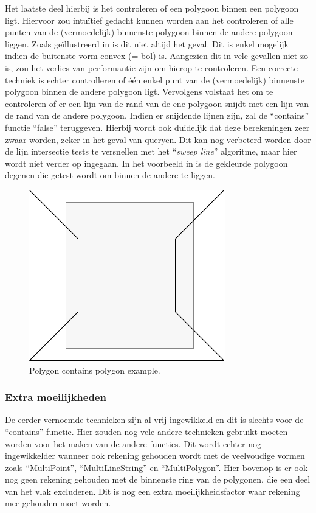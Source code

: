 Het laatste deel hierbij is het controleren of een polygoon binnen een polygoon ligt. Hiervoor zou intuïtief gedacht kunnen worden aan het controleren of alle punten van de (vermoedelijk) binnenste polygoon binnen de andere polygoon liggen. Zoals geïllustreerd in  is dit niet altijd het geval. Dit is enkel mogelijk indien de buitenste vorm convex (= bol) is. Aangezien dit in vele gevallen niet zo is, zou het verlies van performantie zijn om hierop te controleren. Een correcte techniek is echter controlleren of één enkel punt van de (vermoedelijk) binnenste polygoon binnen de andere polygoon ligt. Vervolgens volstaat het om te controleren of er een lijn van de rand van de ene polygoon snijdt met een lijn van de rand van de andere polygoon. Indien er snijdende lijnen zijn, zal de ``contains'' functie ``false'' teruggeven. Hierbij wordt ook duidelijk dat deze berekeningen zeer zwaar worden, zeker in het geval van queryen. Dit kan nog verbeterd worden door de lijn intersectie tests te versnellen met het ``\textit{sweep line}'' algoritme, maar hier wordt niet verder op ingegaan. In het voorbeeld in  is de gekleurde polygoon degenen die getest wordt om binnen de andere te liggen.

\begin{figure}
    \centering
    \includegraphics[width=0.3\linewidth]{images/polygon_contains_polygon.png}
    \caption{Polygon contains polygon example.}
    \label{fig:polygon_contains_polygon}
\end{figure}


\subsubsection{Extra moeilijkheden}
De eerder vernoemde technieken zijn al vrij ingewikkeld en dit is slechts voor de ``contains'' functie. Hier zouden nog vele andere technieken gebruikt moeten worden voor het maken van de andere functies. Dit wordt echter nog ingewikkelder wanneer ook rekening gehouden wordt met de veelvoudige vormen zoals ``MultiPoint'', ``MultiLineString'' en ``MultiPolygon''. Hier bovenop is er ook nog geen rekening gehouden met de binnenste ring van de polygonen, die een deel van het vlak excluderen. Dit is nog een extra moeilijkheidsfactor waar rekening mee gehouden moet worden.  

